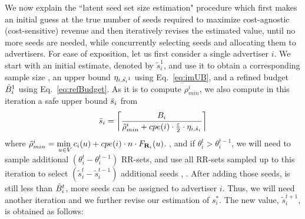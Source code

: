 
We now explain the ``latent seed set size estimation" procedure which first makes an initial guess at the true number of seeds required to maximize cost-agnostic (cost-sensitive) revenue and then iteratively revises the estimated value, until no more seeds are needed, while concurrently selecting seeds and allocating them to advertisers. For ease of exposition, let us first consider a single advertiser $i$. We start with an initial  estimate, denoted by $\tilde{s}_i^1$, and use it to obtain a corresponding sample size , an upper bound $\textcolor{black}{\eta_{i,\tilde{s_i}^1}}$ using Eq.~\ref{eq:imUB}, and a refined budget ${\tilde{B}_{i}}^1$ using Eq.~\ref{eq:refBudget}. As it is \SPhard to compute $\rho^i_{min}$, we also compute in this iteration a safe upper bound $\bar{s}_{i}$ from  $$\bar{s}_{i} = \left\lceil \frac{B_i}{\tilde{\rho}^i_{min} + cpe({i}) \cdot \frac{\varepsilon}{2} \cdot \eta_{i,\tilde{s}_i}} \right\rceil$$
where $\tilde{\rho}^i_{min} = \underset{u \in V}{\min~} c_i(u) + cpe(i) \cdot n \cdot F_{\mathbf{R}_i}(u)$. , and if ${\theta}_i^t > {\theta}_i^{t-1}$, we will need to sample additional $({\theta}_i^t - {\theta}_i^{t-1})$ RR-sets, and use all RR-sets sampled up to this iteration to select $(\tilde{s}_i^t - \tilde{s}_i^{t-1})$ additional seeds , . After adding those seeds,  is still less than $\tilde{B}_{i}^t$, more seeds can be assigned to advertiser $i$. Thus, we will need another iteration and we further revise our estimation of $s^*_i$. The new value, $\tilde{s}_i^{t+1}$, is obtained as follows:


